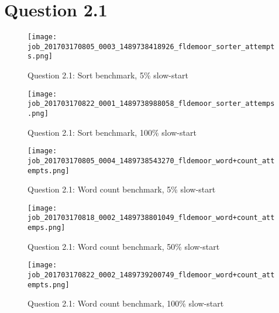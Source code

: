 \section{Question 2.1}

\begin{figure}[!ht]
    \centering
    \texttt{[image: job\_201703170805\_0003\_1489738418926\_fldemoor\_sorter\_attempts.png]}
    \caption{Question 2.1: Sort benchmark, 5\% slow-start}
    \label{2.1.sort.5}
\end{figure}
\newpage

\begin{figure}[!ht]
    \centering
    \texttt{[image: job\_201703170822\_0001\_1489738988058\_fldemoor\_sorter\_attemps.png]}
    \caption{Question 2.1: Sort benchmark, 100\% slow-start}
    \label{2.1.sort.100}
\end{figure}
\newpage

\begin{figure}[!ht]
    \centering
    \texttt{[image: job\_201703170805\_0004\_1489738543270\_fldemoor\_word+count\_attempts.png]}
    \caption{Question 2.1: Word count benchmark, 5\% slow-start}
    \label{2.1.wc.5}
\end{figure}
\newpage

\begin{figure}[!ht]
    \centering
    \texttt{[image: job\_201703170818\_0002\_1489738801049\_fldemoor\_word+count\_attemps.png]}
    \caption{Question 2.1: Word count benchmark, 50\% slow-start}
    \label{2.1.wc.50}
\end{figure}
\newpage

\begin{figure}[!ht]
    \centering
    \texttt{[image: job\_201703170822\_0002\_1489739200749\_fldemoor\_word+count\_attempts.png]}
    \caption{Question 2.1: Word count benchmark, 100\% slow-start}
    \label{2.1.wc.100}
\end{figure}
\newpage